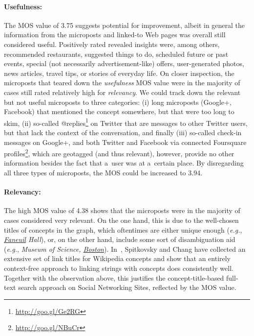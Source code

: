 \documentclass[runningheads,a4paper]{llncs}
\begin{document}
\paragraph{Usefulness:}
The MOS value of 3.75 suggests potential for improvement,
albeit in general the information from the microposts and linked-to Web pages
was overall still considered useful.
Positively rated revealed insights were, among others, recommended restaurants,
suggested things to do, scheduled future or past events,
special (not necessarily advertisement-like) offers, user-generated photos,
news articles, travel tips, or stories of everyday life.
On closer inspection, the microposts that teared down the \emph{usefulness} MOS value
were in the majority of cases still rated relatively high for \emph{relevancy}.
We could track down the relevant but not useful microposts to three categories:
(i) long microposts (Google+, Facebook) that mentioned the concept somewhere,
but that were too long to skim,
(ii) so-called
@replies\footnote{\url{http://goo.gl/Ge2RG}}
on Twitter that are messages to other Twitter users,
but that lack the context of the conversation, and finally
(iii) so-called check-in messages on Google+, and both Twitter and Facebook
via connected Foursquare profiles\footnote{\url{http://goo.gl/NBuCr}},
which are geotagged (and thus relevant), however,
provide no other information besides the fact that a~user was at a~certain place.
By disregarding all three types of microposts, the MOS could be increased to 3.94.

\paragraph{Relevancy:}
The high MOS value of 4.38 shows that the microposts
were in the majority of cases considered very relevant.
On the one hand, this is due to the well-chosen titles of concepts in the graph,
which oftentimes are either unique enough (\emph{e.g.}, \emph{\underline{Faneuil} Hall}),
or, on the other hand, include some sort of disambiguation aid
(\emph{e.g.}, \emph{Museum of Science, \underline{Boston}}).
In~\cite{spitkovsky2012}, Spitkovsky and Chang have collected
an extensive set of link titles for Wikipedia concepts
and show that an entirely context-free approach
to linking strings with concepts does consistently well.
Together with the observation above, this justifies
the concept-title-based full-text search approach on Social Networking Sites,
reflected by the MOS value.





\end{document}
